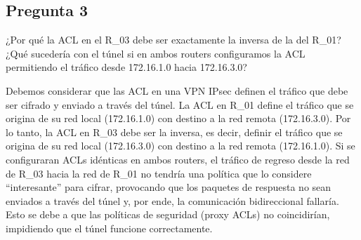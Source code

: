 \subsection{Pregunta 3}

¿Por qué la ACL en el R\_03 debe ser exactamente la inversa de la del R\_01? ¿Qué sucedería con el túnel si en ambos routers configuramos la ACL permitiendo el tráfico desde 172.16.1.0 hacia 172.16.3.0?

\begin{respuesta}
Debemos considerar que las ACL en una VPN IPsec definen el tráfico que debe ser cifrado y enviado a través del túnel. La ACL en R\_01 define el tráfico que se origina de su red local (172.16.1.0) con destino a la red remota (172.16.3.0). Por lo tanto, la ACL en R\_03 debe ser la inversa, es decir, definir el tráfico que se origina de su red local (172.16.3.0) con destino a la red remota (172.16.1.0). Si se configuraran ACLs idénticas en ambos routers, el tráfico de regreso desde la red de R\_03 hacia la red de R\_01 no tendría una política que lo considere ``interesante'' para cifrar, provocando que los paquetes de respuesta no sean enviados a través del túnel y, por ende, la comunicación bidireccional fallaría. Esto se debe a que las políticas de seguridad (proxy ACLs) no coincidirían, impidiendo que el túnel funcione correctamente.
\end{respuesta}
